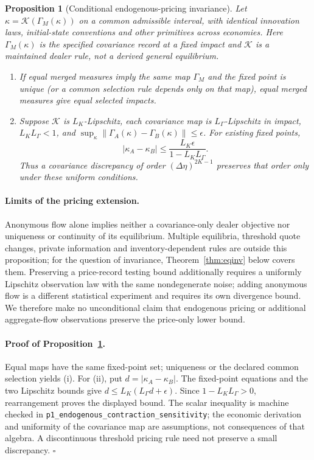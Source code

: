 \documentclass[12pt]{article}
\newtheorem{proposition}[theorem]{Proposition}
\theoremstyle{definition}
\theoremstyle{remark}
\begin{document}
\begin{proposition}[Conditional endogenous-pricing invariance]\label{prop:endogenous_kappa}
Let $\kappa=\mathcal K(\Gamma_M(\kappa))$ on a common admissible interval, with identical innovation laws, initial-state conventions and other primitives across economies. Here $\Gamma_M(\kappa)$ is the specified covariance record at a fixed impact and $\mathcal K$ is a maintained dealer rule, not a derived general equilibrium.
\begin{enumerate}[label=(\roman*)]
\item If equal merged measures imply the same map $\Gamma_M$ and the fixed point is unique (or a common selection rule depends only on that map), equal merged measures give equal selected impacts.
\item Suppose $\mathcal K$ is $L_K$-Lipschitz, each covariance map is $L_\Gamma$-Lipschitz in impact, $L_KL_\Gamma<1$, and $\sup_\kappa\|\Gamma_A(\kappa)-\Gamma_B(\kappa)\|\le\epsilon$. For existing fixed points,
\begin{equation}\label{eq:kappa_closeness}
 |\kappa_A-\kappa_B|\le\frac{L_K\epsilon}{1-L_KL_\Gamma}.
\end{equation}
Thus a covariance discrepancy of order $(\Delta\eta)^{2K-1}$ preserves that order only under these uniform conditions.
\end{enumerate}
\end{proposition}

\paragraph{Limits of the pricing extension.} Anonymous flow alone implies neither a covariance-only dealer objective nor uniqueness or continuity of its equilibrium. Multiple equilibria, threshold quote changes, private information and inventory-dependent rules are outside this proposition; for the question of invariance, Theorem~\ref{thm:eqinv} below covers them. Preserving a price-record testing bound additionally requires a uniformly Lipschitz observation law with the same nondegenerate noise; adding anonymous flow is a different statistical experiment and requires its own divergence bound. We therefore make no unconditional claim that endogenous pricing or additional aggregate-flow observations preserve the price-only lower bound.
\paragraph{Proof of Proposition~\ref{prop:endogenous_kappa}.}
 Equal maps have the same fixed-point set; uniqueness or the declared common selection yields (i). For (ii), put $d=|\kappa_A-\kappa_B|$. The fixed-point equations and the two Lipschitz bounds give $d\le L_K(L_\Gamma d+\epsilon)$. Since $1-L_KL_\Gamma>0$, rearrangement proves the displayed bound. The scalar inequality is machine checked in \nolinkurl{p1_endogenous_contraction_sensitivity}; the economic derivation and uniformity of the covariance map are assumptions, not consequences of that algebra. A discontinuous threshold pricing rule need not preserve a small discrepancy. $\square$
\end{document}
